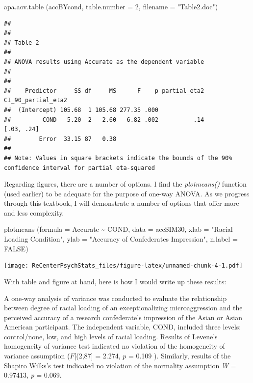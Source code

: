 \documentclass[
  english,
]{book}
\newenvironment{Shaded}{\begin{snugshade}}{\end{snugshade}}
\newcommand{\AttributeTok}[1]{\textcolor[rgb]{0.77,0.63,0.00}{#1}}
\newcommand{\ConstantTok}[1]{\textcolor[rgb]{0.00,0.00,0.00}{#1}}
\newcommand{\DecValTok}[1]{\textcolor[rgb]{0.00,0.00,0.81}{#1}}
\newcommand{\FunctionTok}[1]{\textcolor[rgb]{0.00,0.00,0.00}{#1}}
\newcommand{\NormalTok}[1]{#1}
\newcommand{\SpecialCharTok}[1]{\textcolor[rgb]{0.00,0.00,0.00}{#1}}
\newcommand{\StringTok}[1]{\textcolor[rgb]{0.31,0.60,0.02}{#1}}
\begin{document}
\begin{Shaded}
\begin{Highlighting}[]
\FunctionTok{apa.aov.table}\NormalTok{ (accBYcond, }\AttributeTok{table.number =} \DecValTok{2}\NormalTok{, }\AttributeTok{filename =} \StringTok{"Table2.doc"}\NormalTok{)}
\end{Highlighting}
\end{Shaded}

\begin{verbatim}
## 
## 
## Table 2 
## 
## ANOVA results using Accurate as the dependent variable
##  
## 
##    Predictor     SS df     MS      F    p partial_eta2 CI_90_partial_eta2
##  (Intercept) 105.68  1 105.68 277.35 .000                                
##         COND   5.20  2   2.60   6.82 .002          .14         [.03, .24]
##        Error  33.15 87   0.38                                            
## 
## Note: Values in square brackets indicate the bounds of the 90% confidence interval for partial eta-squared
\end{verbatim}

Regarding figures, there are a number of options. I find the \emph{plotmeans()} function (used earlier) to be adequate for the purpose of one-way ANOVA. As we progress through this textbook, I will demonstrate a number of options that offer more and less complexity.

\begin{Shaded}
\begin{Highlighting}[]
\FunctionTok{plotmeans}\NormalTok{ (}\AttributeTok{formula =}\NormalTok{ Accurate }\SpecialCharTok{\textasciitilde{}}\NormalTok{ COND, }\AttributeTok{data =}\NormalTok{ accSIM30, }\AttributeTok{xlab =} \StringTok{"Racial Loading Condition"}\NormalTok{, }\AttributeTok{ylab =} \StringTok{"Accuracy of Confederate\textquotesingle{}s Impression"}\NormalTok{, }\AttributeTok{n.label =} \ConstantTok{FALSE}\NormalTok{)}
\end{Highlighting}
\end{Shaded}

\texttt{[image: ReCenterPsychStats\_files/figure-latex/unnamed-chunk-4-1.pdf]}

With table and figure at hand, here is how I would write up these results:

A one-way analysis of variance was conducted to evaluate the relationship between degree of racial loading of an exceptionalizing microaggression and the perceived accuracy of a research confederate's impression of the Asian or Asian American participant. The independent variable, COND, included three levels: control/none, low, and high levels of racial loading. Results of Levene's homogeneity of variance test indicated no violation of the homogeneity of variance assumption (\(F\){[}(2,87{]} = 2.274, \(p\) = 0.109 ). Similarly, results of the Shapiro Wilks's test indicated no violation of the normality assumption \emph{W} = 0.97413, \emph{p} = 0.069.
\end{document}
